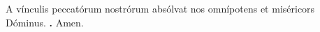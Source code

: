  \hspace{.3em}
A vínculis peccatórum nostrórum absólvat nos omnípotens et miséricors Dóminus. 
\textbf{\Rbar.} Amen.




